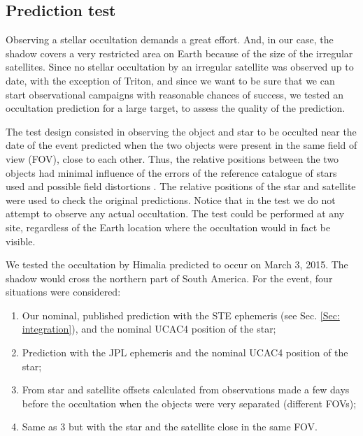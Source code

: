 \documentclass[useAMS,usenatbib]{mn2e}
\begin{document}
\subsection{Prediction test} \label{Sec: testes}

Observing a stellar occultation demands a great effort. And, in our case, the shadow covers a very restricted area on Earth because of the size of the irregular satellites. Since no stellar occultation by an irregular satellite was observed up to date, with the exception of Triton, and since we want to be sure that we can start observational campaigns with reasonable chances of success, we tested an occultation prediction for a large target, to assess the quality of the prediction.

The test design consisted in observing the object and star to be occulted near the date of the event predicted when the two objects were present in the same field of view (FOV), close to each other. Thus, the relative positions between the two objects had minimal influence of the errors of the reference catalogue of stars used and possible field distortions \citep[and references therein]{Peng2008}. The relative positions of the star and satellite were used to check the original predictions. Notice that in the test we do not attempt to observe any actual occultation. The test could be performed at any site, regardless of the Earth location where the occultation would in fact be visible. 

We tested the occultation by Himalia predicted to occur on March 3, 2015. The shadow would cross the northern part of South America. For the event, four situations were considered:
\begin{enumerate}[I]
\item Our nominal, published prediction with the STE ephemeris (see Sec. \ref{Sec: integration}), and the nominal UCAC4 position of the star;
\item Prediction with the JPL ephemeris and the nominal UCAC4 position of the star;
\item From star and satellite offsets calculated from observations made a few days before the occultation when the objects were very separated (different FOVs);
\item Same as 3 but with the star and the satellite close in the same FOV.
\end{enumerate}
\end{document}
